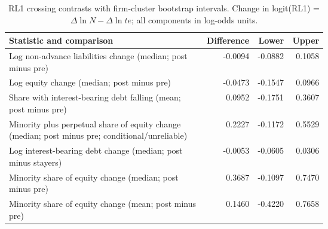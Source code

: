 \begin{table}[!htbp]\centering\scriptsize
\caption{RL1 crossing contrasts with firm-cluster bootstrap intervals. Change in logit(RL1) = $\Delta\ln N - \Delta\ln te$; all components in log-odds units.}
\begin{threeparttable}
\begin{tabular}{p{0.62\linewidth}rrr}
\toprule
Statistic and comparison & Difference & Lower & Upper \\
\midrule
Log non-advance liabilities change (median; post minus pre) & -0.0094 & -0.0882 & 0.1058 \\
Log equity change (median; post minus pre) & -0.0473 & -0.1547 & 0.0966 \\
Share with interest-bearing debt falling (mean; post minus pre) & 0.0952 & -0.1751 & 0.3607 \\
Minority plus perpetual share of equity change (median; post minus pre; conditional/unreliable) & 0.2227 & -0.1172 & 0.5529 \\
Log interest-bearing debt change (median; post minus stayers) & -0.0053 & -0.0605 & 0.0306 \\
Minority share of equity change (median; post minus pre) & 0.3687 & -0.1097 & 0.7470 \\
Minority share of equity change (mean; post minus pre) & 0.1460 & -0.4220 & 0.7658 \\
\bottomrule
\end{tabular}
\begin{tablenotes}[flushleft]\footnotesize

\end{tablenotes}
\end{threeparttable}
\end{table}
